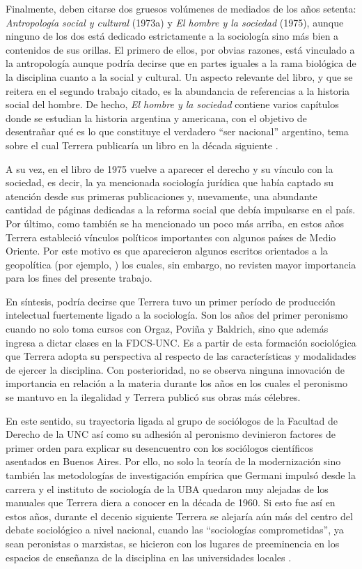 Finalmente, deben citarse dos gruesos volúmenes de mediados de los años setenta: \emph{Antropología social y cultural} (1973a) y \emph{El hombre y la sociedad} (1975), aunque ninguno de los dos está dedicado estrictamente a la sociología sino más bien a contenidos de sus orillas. El primero de ellos, por obvias razones, está vinculado a la antropología aunque podría decirse que en partes iguales a la rama biológica de la disciplina cuanto a la social y cultural. Un aspecto relevante del libro, y que se reitera en el segundo trabajo citado, es la abundancia de referencias a la historia social del hombre. De hecho, \emph{El hombre y la sociedad} contiene varios capítulos donde se estudian la historia argentina y americana, con el objetivo de desentrañar qué es lo que constituye el verdadero \enquote{ser nacional} argentino, tema sobre el cual Terrera publicaría un libro en la década siguiente \parencite{1721-TERRERA1983}.

A su vez, en el libro de 1975 vuelve a aparecer el derecho y su vínculo con la sociedad, es decir, la ya mencionada sociología jurídica que había captado su atención desde sus primeras publicaciones y, nuevamente, una abundante cantidad de páginas dedicadas a la reforma social que debía impulsarse en el país. Por último, como también se ha mencionado un poco más arriba, en estos años Terrera estableció vínculos políticos importantes con algunos países de Medio Oriente. Por este motivo es que aparecieron algunos escritos orientados a la geopolítica (por ejemplo, \cite{1722-TERRERA1976,1723-TERRERA1979}) los cuales, sin embargo, no revisten mayor importancia para los fines del presente trabajo.

En síntesis, podría decirse que Terrera tuvo un primer período de producción intelectual fuertemente ligado a la sociología. Son los años del primer peronismo cuando no solo toma cursos con Orgaz, Poviña y Baldrich, sino que además ingresa a dictar clases en la FDCS-UNC. Es a partir de esta formación sociológica que Terrera adopta su perspectiva al respecto de las características y modalidades de ejercer la disciplina. Con posterioridad, no se observa ninguna innovación de importancia en relación a la materia durante los años en los cuales el peronismo se mantuvo en la ilegalidad y Terrera publicó sus obras más célebres.

En este sentido, su trayectoria ligada al grupo de sociólogos de la Facultad de Derecho de la UNC así como su adhesión al peronismo devinieron factores de primer orden para explicar su desencuentro con los sociólogos científicos asentados en Buenos Aires. Por ello, no solo la teoría de la modernización sino también las metodologías de investigación empírica que Germani impulsó desde la carrera y el instituto de sociología de la UBA quedaron muy alejadas de los manuales que Terrera diera a conocer en la década de 1960. Si esto fue así en estos años, durante el decenio siguiente Terrera se alejaría aún más del centro del debate sociológico a nivel nacional, cuando las \enquote{sociologías comprometidas}, ya sean peronistas o marxistas, se hicieron con los lugares de preeminencia en los espacios de enseñanza de la disciplina en las universidades locales \parencite{1508-SIDICARO1993}.

